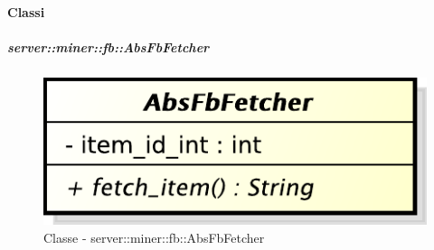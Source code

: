 	\paragraph{Classi} %
		\subparagraph{server::miner::fb::AbsFbFetcher} %
		\label{subp:server_miner_fb_AbsFbFetcher}
		    \begin{figure}[H]
 		 		\centering
 				\centerline{\includegraphics[scale=0.75]{./images/server/classes/miner/abs_fb_fetcher.pdf}}
 				\caption{Classe - server::miner::fb::AbsFbFetcher}
			\end{figure}
